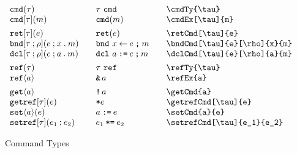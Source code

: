 \documentclass[11pt]{article}
\begin{document}
\begin{figure}

  \begin{small}
    \begin{displaymath}
      \begin{array}{l@{\qquad}l@{\qquad}l@{\qquad}l}
        \cmdTy{\tau}               & \cmdTy*{\tau}               & \verb|\cmdTy{\tau}|               \\
        \cmdEx[\tau]{m}            & \cmdEx*{m}                  & \verb|\cmdEx[\tau]{m}|            \\[1ex]
        \retCmd[\tau]{e}           & \retCmd*{e}                 & \verb|\retCmd[\tau]{e}|           \\
        \bndCmd[\tau]{e}[\rho]{x}{m}           & \bndCmd*{e}{x}{m}           & \verb|\bndCmd[\tau]{e}[\rho]{x}{m}|           \\
        \dclCmd[\tau]{e}[\rho]{a}{m}           & \dclCmd*{e}{a}{m}           & \verb|\dclCmd[\tau]{e}[\rho]{a}{m}|           \\[1ex]
        \refTy{\tau}               & \refTy*{\tau}               & \verb|\refTy{\tau}| \\
        \refEx{a}                  & \refEx*{a}                  & \verb|\refEx{a}|                  \\[1ex]
        \getCmd{a}                 & \getCmd*{a}                 & \verb|\getCmd{a}|                 \\
        \getrefCmd[\tau]{e}        & \getrefCmd*{e}              & \verb|\getrefCmd[\tau]{e}|        \\
        \setCmd{a}{e}              & \setCmd*{a}{e}              & \verb|\setCmd{a}{e}|              \\
        \setrefCmd[\tau]{e_1}{e_2} & \setrefCmd*[\tau]{e_1}{e_2} & \verb|\setrefCmd[\tau]{e_1}{e_2}|
      \end{array}
    \end{displaymath}
  \end{small}

  \caption{Command Types}
  \label{fig:cmd}
\end{figure}
\end{document}
